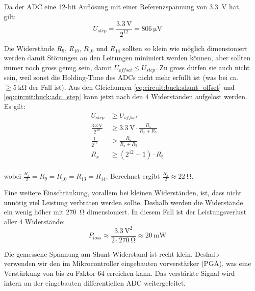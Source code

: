 Da   der   ADC   eine   12-bit   Aufl\"osung   mit  einer  Referenzspannung  von
\SI{3.3}{\volt} hat, gilt:
\begin{equation}
    U_{step} = \frac{\SI{3.3}{\volt}}{2^{12}} = \SI{806}{\micro\volt}
    \label{eq:circuit:buck:adc_step}
\end{equation}

Die Widerst\"ande $R_9$, $R_{10}$, $R_{10}$ und  $R_{14}$  sollten  so klein wie
m\"oglich  dimensioniert  werden damit St\"orungen an  den  Leitungen  minimiert
werden  k\"onnen,  aber  sollten immer noch gross genug sein, damit  $U_{offset}
\leq  U_{step}$.  Zu  gross  d\"urfen  sie  auch  nicht  sein,  weil  sonst  die
Holding-Time  des   ADCs   nicht   mehr   erf\"ullt   ist  (was  bei  ca.  $\geq
\SI{5}{\kilo\ohm}$      der      Fall     ist).     Aus     den      Gleichungen
\ref{eq:circuit:buck:shunt_offset} und \ref{eq:circuit:buck:adc_step} kann jetzt
nach den 4 Widerst\"anden aufgel\"ost werden. Es gilt:
\begin{align*}
                          U_{step} &\geq U_{offset} \\
    \frac{\SI{3.3}{\volt}}{2^{12}} &\geq \SI{3.3}{\volt} \cdot \frac{R_5}{R_x + R_5} \\
                  \frac{1}{2^{12}} &\geq \frac{R_5}{R_x + R_5} \\
                               R_x &\geq \left( 2^{12} - 1 \right) \cdot R_5 \\
\end{align*}

wobei  $\frac{R_x}{2}  =  R_{9}  =  R_{10} = R_{13} = R_{14}$. Berechnet  ergibt
$\frac{R_x}{2} \approx \SI{22}{\ohm}$.

Eine weitere Einschr\"ankung, vorallem bei  kleinen  Widerst\"anden,  ist,  dass
nicht  unn\"otig  viel  Leistung  verbraten  werden sollte. Deshalb  werden  die
Widerst\"ande ein wenig h\"oher mit \SI{270}{\ohm} dimensioniert. In diesem Fall
ist der Leistungsverlust aller 4 Widerst\"ande:
\begin{equation*}
    P_{loss} \approx \frac{\SI{3.3}{\volt}^2}{2\cdot \SI{270}{\ohm}} \approx \SI{20}{\milli\watt}
\end{equation*}

Die gemessene Spannung  am  Shunt-Widerstand  ist recht klein. Deshalb verwenden
wir  den  im  Mikrocontroller  eingebauten  vorverst\"arker  (PGA),   was   eine
Verst\"arkung von bis  zu Faktor 64 erreichen kann. Das verst\"arkte Signal wird
intern an der eingebauten differentiellen ADC weitergeleitet.

